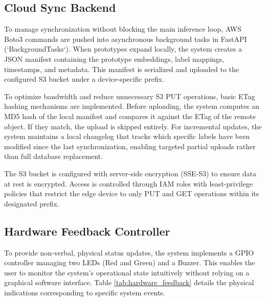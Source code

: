 \documentclass[12pt,a4paper]{report}
\begin{document}
\subsection{Cloud Sync Backend}
To manage synchronization without blocking the main inference loop, AWS Boto3 commands are pushed into asynchronous background tasks in FastAPI (`BackgroundTasks`). When prototypes expand locally, the system creates a JSON manifest containing the prototype embeddings, label mappings, timestamps, and metadata. This manifest is serialized and uploaded to the configured S3 bucket under a device-specific prefix.

To optimize bandwidth and reduce unnecessary S3 PUT operations, basic ETag hashing mechanisms are implemented. Before uploading, the system computes an MD5 hash of the local manifest and compares it against the ETag of the remote object. If they match, the upload is skipped entirely. For incremental updates, the system maintains a local changelog that tracks which specific labels have been modified since the last synchronization, enabling targeted partial uploads rather than full database replacement.

The S3 bucket is configured with server-side encryption (SSE-S3) to ensure data at rest is encrypted. Access is controlled through IAM roles with least-privilege policies that restrict the edge device to only PUT and GET operations within its designated prefix.

\subsection{Hardware Feedback Controller}
To provide non-verbal, physical status updates, the system implements a GPIO controller managing two LEDs (Red and Green) and a Buzzer. This enables the user to monitor the system's operational state intuitively without relying on a graphical software interface. Table \ref{tab:hardware_feedback} details the physical indications corresponding to specific system events.
\end{document}
